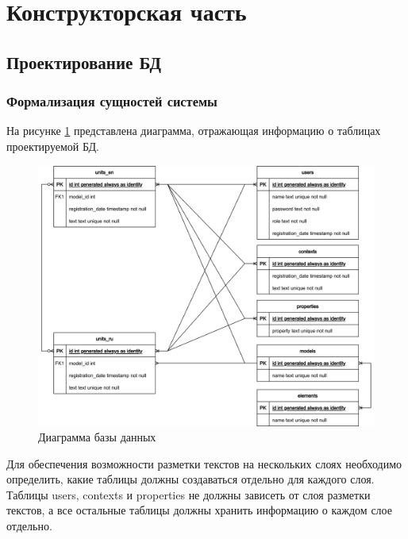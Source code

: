 \section{Конструкторская часть}


\subsection{Проектирование БД}

\subsubsection{Формализация сущностей системы}

На рисунке \ref{fig:db} представлена диаграмма, отражающая информацию о таблицах проектируемой БД.

\begin{figure}[h]
	\centering
	\includegraphics[width=\textwidth ]{img/db/db.drawio.png}
	\caption{Диаграмма базы данных}
	\label{fig:db}
\end{figure} 

Для обеспечения возможности разметки текстов на нескольких слоях необходимо определить, какие таблицы должны создаваться отдельно для каждого слоя. Таблицы users, contexts и properties не должны зависеть от слоя разметки текстов, а все остальные таблицы должны хранить информацию о каждом слое отдельно.

